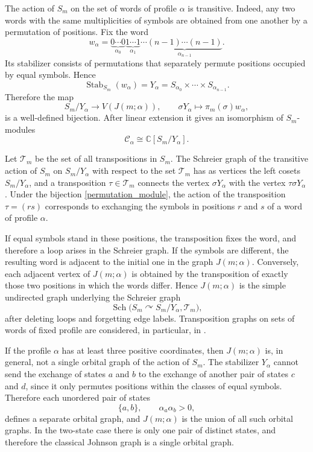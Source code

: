\documentclass[12pt,reqno]{amsart}
\begin{document}
The action of $S_m$ on the set of words of profile $\alpha$ is
transitive. Indeed, any two words with the same multiplicities of symbols
are obtained from one another by a permutation of positions. Fix the word
$$
w_\alpha
=
\underbrace{0\cdots0}_{\alpha_0}
\underbrace{1\cdots1}_{\alpha_1}
\cdots
\underbrace{(n-1)\cdots(n-1)}_{\alpha_{n-1}}.
$$
Its stabilizer consists of permutations that separately permute positions
occupied by equal symbols. Hence
$$
\operatorname{Stab}_{S_m}(w_\alpha)
=
Y_\alpha
=
S_{\alpha_0}\times\cdots\times S_{\alpha_{n-1}}.
$$
Therefore the map
$$
S_m/Y_\alpha\longrightarrow V(J(m;\alpha)),
\qquad
\sigma Y_\alpha\longmapsto \pi_m(\sigma)w_\alpha,
$$
is a well-defined bijection. After linear extension it gives an
isomorphism of $S_m$-modules
\begin{equation}\label{permutation_module}
\mathcal C_\alpha
\cong
\mathbb C[S_m/Y_\alpha].
\end{equation}

Let $\mathcal T_m$ be the set of all transpositions in $S_m$. The Schreier
graph of the transitive action of $S_m$ on $S_m/Y_\alpha$ with respect to
the set $\mathcal T_m$ has as vertices the left cosets $S_m/Y_\alpha$,
and a transposition $\tau\in\mathcal T_m$ connects the vertex
$\sigma Y_\alpha$ with the vertex $\tau\sigma Y_\alpha$
\cite{Sabatini2022}. Under the bijection \eqref{permutation_module}, the
action of the transposition $\tau=(rs)$ corresponds to exchanging the
symbols in positions $r$ and $s$ of a word of profile $\alpha$.

If equal symbols stand in these positions, the transposition fixes the
word, and therefore a loop arises in the Schreier graph. If the symbols
are different, the resulting word is adjacent to the initial one in the
graph $J(m;\alpha)$. Conversely, each adjacent vertex of $J(m;\alpha)$ is
obtained by the transposition of exactly those two positions in which the
words differ. Hence $J(m;\alpha)$ is the simple undirected graph underlying
the Schreier graph
$$
\operatorname{Sch}
\bigl(S_m\curvearrowright S_m/Y_\alpha,\mathcal T_m\bigr),
$$
after deleting loops and forgetting edge labels. Transposition graphs on
sets of words of fixed profile are considered, in particular, in
\cite{Chase1973,Ruskey1988,FilmusODonnellWu2022}.

If the profile $\alpha$ has at least three positive coordinates, then
$J(m;\alpha)$ is, in general, not a single orbital graph of the action of
$S_m$. The stabilizer $Y_\alpha$ cannot send the exchange of states $a$
and $b$ to the exchange of another pair of states $c$ and $d$, since it
only permutes positions within the classes of equal symbols. Therefore
each unordered pair of states
$$
\{a,b\},
\qquad
\alpha_a\alpha_b>0,
$$
defines a separate orbital graph, and $J(m;\alpha)$ is the union of all
such orbital graphs. In the two-state case there is only one pair of
distinct states, and therefore the classical Johnson graph is a single
orbital graph.
\end{document}
